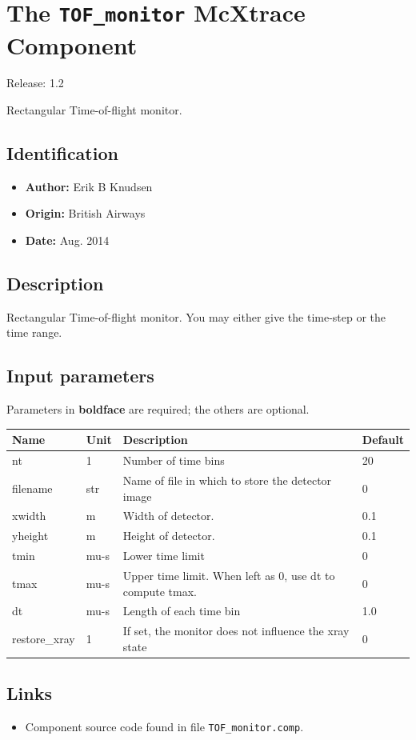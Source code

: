 \section{The \texttt{TOF\_monitor} McXtrace Component}
Release: 1.2

Rectangular Time-of-flight monitor.

\subsection*{Identification}
\begin{itemize}
  \item \textbf{Author:} Erik B Knudsen
  \item \textbf{Origin:} British Airways
  \item \textbf{Date:} Aug. 2014
\end{itemize}

\subsection*{Description}
Rectangular Time-of-flight monitor. You may either give the time-step or the time range.

\subsection*{Input parameters}
Parameters in \textbf{boldface} are required; the others are optional.

\begin{longtable}{p{}p{}p{}p{}}
\toprule
\textbf{Name} & \textbf{Unit} & \textbf{Description} & \textbf{Default} \\
\midrule
\endhead
nt & 1 & Number of time bins & 20 \\
filename & str & Name of file in which to store the detector image & 0 \\
xwidth & m & Width of detector. & 0.1 \\
yheight & m & Height of detector. & 0.1 \\
tmin & mu-s & Lower time limit & 0 \\
tmax & mu-s & Upper time limit. When left as 0, use dt to compute tmax. & 0 \\
dt & mu-s & Length of each time bin & 1.0 \\
restore\_xray & 1 & If set, the monitor does not influence the xray state & 0 \\
\bottomrule
\end{longtable}

\subsection*{Links}
\begin{itemize}
  \item Component source code found in file \texttt{TOF\_monitor.comp}.
\end{itemize}
